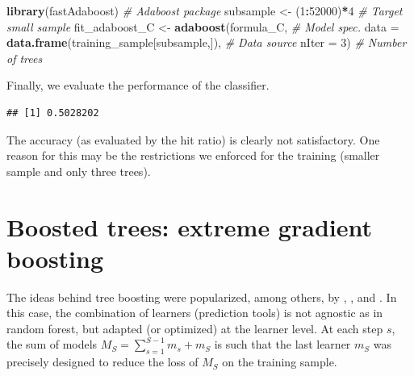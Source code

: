 \documentclass[]{krantz}
\makeatletter
\newenvironment{Shaded}{\begin{snugshade}}{\end{snugshade}}
\newcommand{\CommentTok}[1]{\textcolor[rgb]{0.37,0.37,0.37}{\textit{#1}}}
\newcommand{\DataTypeTok}[1]{\textcolor[rgb]{0.27,0.27,0.27}{#1}}
\newcommand{\DecValTok}[1]{\textcolor[rgb]{0.06,0.06,0.06}{#1}}
\newcommand{\KeywordTok}[1]{\textcolor[rgb]{0.27,0.27,0.27}{\textbf{#1}}}
\newcommand{\NormalTok}[1]{#1}
\newcommand{\OperatorTok}[1]{\textcolor[rgb]{0.43,0.43,0.43}{\textbf{#1}}}
\newcommand{\StringTok}[1]{\textcolor[rgb]{0.5,0.5,0.5}{#1}}
\newenvironment{kframe}{%
\medskip{}
\setlength{\fboxsep}{.8em}
 \def\at@end@of@kframe{}%
 \ifinner\ifhmode%
  \def\at@end@of@kframe{\end{minipage}}%
  \begin{minipage}{\columnwidth}%
 \fi\fi%
 \def\FrameCommand##1{\hskip\@totalleftmargin \hskip-\fboxsep
 \colorbox{shadecolor}{##1}\hskip-\fboxsep
     \hskip-\linewidth \hskip-\@totalleftmargin \hskip\columnwidth}%
 \MakeFramed {\advance\hsize-\width
   \@totalleftmargin\z@ \linewidth\hsize
   \@setminipage}}%
 {\par\unskip\endMakeFramed%
 \at@end@of@kframe}
\renewenvironment{Shaded}{\begin{kframe}}{\end{kframe}}
\theoremstyle{definition}
\theoremstyle{definition}
\theoremstyle{definition}
\theoremstyle{remark}
\makeatother
\begin{document}
\begin{Shaded}
\begin{Highlighting}[]
\KeywordTok{library}\NormalTok{(fastAdaboost)                                                     }\CommentTok{# Adaboost package }
\NormalTok{subsample <-}\StringTok{ }\NormalTok{(}\DecValTok{1}\OperatorTok{:}\DecValTok{52000}\NormalTok{)}\OperatorTok{*}\DecValTok{4}                                                  \CommentTok{# Target small sample}
\NormalTok{fit_adaboost_C <-}\StringTok{ }\KeywordTok{adaboost}\NormalTok{(formula_C,                                     }\CommentTok{# Model spec.}
                         \DataTypeTok{data =} \KeywordTok{data.frame}\NormalTok{(training_sample[subsample,]),  }\CommentTok{# Data source}
                         \DataTypeTok{nIter =} \DecValTok{3}\NormalTok{)                                       }\CommentTok{# Number of trees              }
\end{Highlighting}
\end{Shaded}

\normalsize

Finally, we evaluate the performance of the classifier.

\footnotesize

\begin{Shaded}
\end{Shaded}

\begin{verbatim}
## [1] 0.5028202
\end{verbatim}

\normalsize

The accuracy (as evaluated by the hit ratio) is clearly not
satisfactory. One reason for this may be the restrictions we enforced
for the training (smaller sample and only three trees).

\hypertarget{boosted-trees-extreme-gradient-boosting}{%
\section{Boosted trees: extreme gradient
boosting}\label{boosted-trees-extreme-gradient-boosting}}

The ideas behind tree boosting were popularized, among others, by
\citet{mason2000boosting}, \citet{friedman2001greedy}, and
\citet{friedman2002stochastic}. In this case, the combination of
learners (prediction tools) is not agnostic as in random forest, but
adapted (or optimized) at the learner level. At each step \(s\), the sum
of models \(M_S=\sum_{s=1}^{S-1}m_s+m_S\) is such that the last learner
\(m_S\) was precisely designed to reduce the loss of \(M_S\) on the
training sample.
\end{document}
